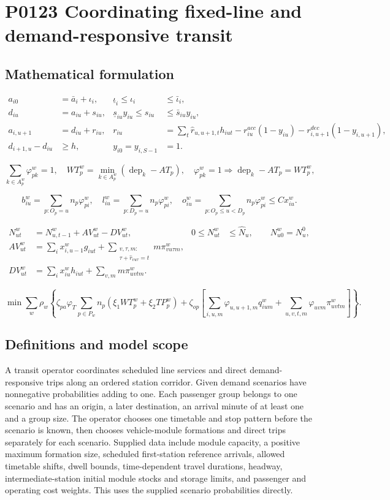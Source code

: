 \documentclass[10pt]{article}
\begin{document}
\section*{P0123 Coordinating fixed-line and demand-responsive transit}
\subsection*{Mathematical formulation}
\begin{align*}
 a_{i0}&=\bar a_i+\iota_i,&\underline\iota_i\le\iota_i&\le\bar\iota_i,\\
 d_{iu}&=a_{iu}+s_{iu},&
 \underline s_{iu}y_{iu}\le s_{iu}&\le\bar s_{iu}y_{iu},\\
 a_{i,u+1}&=d_{iu}+r_{iu},&
 r_{iu}&=\sum_t\widehat r_{u,u+1,t}h_{iut}
            -r^{acc}_{iu}(1-y_{iu})-r^{dec}_{i,u+1}(1-y_{i,u+1}),\\
 d_{i+1,u}-d_{iu}&\ge h,& y_{i0}=y_{i,S-1}&=1.
\end{align*}

\[
\sum_{k\in A_p^w}\varphi_{pk}^w=1,\quad
WT_p^w=\min_{k\in A_p^w}(\operatorname{dep}_k-AT_p),\quad
\varphi_{pk}^w=1\Longrightarrow
 \operatorname{dep}_k-AT_p=WT_p^w,
\]

\[
 b^w_{iu}=\sum_{p:O_p=u}n_p\varphi_{pi}^w,\quad
 l^w_{iu}=\sum_{p:D_p=u}n_p\varphi_{pi}^w,\quad
 o^w_{iu}=\sum_{p:O_p\le u<D_p}n_p\varphi_{pi}^w
 \le Cx^w_{iu}.
\]

\begin{align*}
 N^w_{ut}&=N^w_{u,t-1}+AV^w_{ut}-DV^w_{ut},&
 0\le N^w_{ut}&\le\widehat N_u,\qquad N^w_{u0}=N_u^0,\\
 AV^w_{ut}&=\sum_i x^w_{i,u-1}g_{iut}
 +\sum_{\substack{v,\tau,m:\\\tau+\widehat r_{vu\tau}=t}}m\pi^w_{vu\tau m},\\
 DV^w_{ut}&=\sum_i x^w_{iu}h_{iut}+\sum_{v,m}m\pi^w_{uvtm}.
\end{align*}

\[
\min\sum_w\rho_w\left\{
\zeta_{pa}\varphi_T\sum_{p\in P_w}n_p(\xi_1WT_p^w+\xi_2TP_p^w)
+\zeta_{op}\left[\sum_{i,u,m}\varphi_{u,u+1,m}q^w_{ium}
+\sum_{u,v,t,m}\varphi_{uvm}\pi^w_{uvtm}\right]\right\}.
\]

\subsection*{Definitions and model scope}
A transit operator coordinates scheduled line services and direct demand-responsive trips along an ordered station corridor. Given demand scenarios have nonnegative probabilities adding to one. Each passenger group belongs to one scenario and has an origin, a later destination, an arrival minute of at least one and a group size. The operator chooses one timetable and stop pattern before the scenario is known, then chooses vehicle-module formations and direct trips separately for each scenario. Supplied data include module capacity, a positive maximum formation size, scheduled first-station reference arrivals, allowed timetable shifts, dwell bounds, time-dependent travel durations, headway, intermediate-station initial module stocks and storage limits, and passenger and operating cost weights. This uses the supplied scenario probabilities directly.
\end{document}
